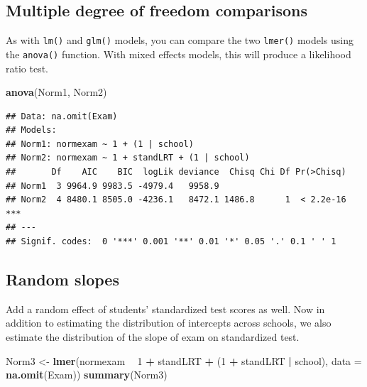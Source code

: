 \documentclass[]{book}
\newenvironment{Shaded}{\begin{snugshade}}{\end{snugshade}}
\newcommand{\DataTypeTok}[1]{\textcolor[rgb]{0.13,0.29,0.53}{#1}}
\newcommand{\DecValTok}[1]{\textcolor[rgb]{0.00,0.00,0.81}{#1}}
\newcommand{\KeywordTok}[1]{\textcolor[rgb]{0.13,0.29,0.53}{\textbf{#1}}}
\newcommand{\NormalTok}[1]{#1}
\newcommand{\OperatorTok}[1]{\textcolor[rgb]{0.81,0.36,0.00}{\textbf{#1}}}
\newcommand{\StringTok}[1]{\textcolor[rgb]{0.31,0.60,0.02}{#1}}
\begin{document}
\hypertarget{multiple-degree-of-freedom-comparisons}{%
\subsection{Multiple degree of freedom comparisons}\label{multiple-degree-of-freedom-comparisons}}

As with \texttt{lm()} and \texttt{glm()} models, you can compare the two \texttt{lmer()} models using the \texttt{anova()} function. With mixed effects models, this will produce a likelihood ratio test.

\begin{Shaded}
\begin{Highlighting}[]
  \KeywordTok{anova}\NormalTok{(Norm1, Norm2)}
\end{Highlighting}
\end{Shaded}

\begin{verbatim}
## Data: na.omit(Exam)
## Models:
## Norm1: normexam ~ 1 + (1 | school)
## Norm2: normexam ~ 1 + standLRT + (1 | school)
##       Df    AIC    BIC  logLik deviance  Chisq Chi Df Pr(>Chisq)    
## Norm1  3 9964.9 9983.5 -4979.4   9958.9                             
## Norm2  4 8480.1 8505.0 -4236.1   8472.1 1486.8      1  < 2.2e-16 ***
## ---
## Signif. codes:  0 '***' 0.001 '**' 0.01 '*' 0.05 '.' 0.1 ' ' 1
\end{verbatim}

\hypertarget{random-slopes}{%
\subsection{Random slopes}\label{random-slopes}}

Add a random effect of students' standardized test scores as well. Now in addition to estimating the distribution of intercepts across schools, we also estimate the distribution of the slope of exam on standardized test.

\begin{Shaded}
\begin{Highlighting}[]
\NormalTok{  Norm3 <-}\StringTok{ }\KeywordTok{lmer}\NormalTok{(normexam }\OperatorTok{~}\StringTok{ }\DecValTok{1} \OperatorTok{+}\StringTok{ }\NormalTok{standLRT }\OperatorTok{+}\StringTok{ }\NormalTok{(}\DecValTok{1} \OperatorTok{+}\StringTok{ }\NormalTok{standLRT }\OperatorTok{|}\StringTok{ }\NormalTok{school), }
                \DataTypeTok{data =} \KeywordTok{na.omit}\NormalTok{(Exam)) }
  \KeywordTok{summary}\NormalTok{(Norm3) }
\end{Highlighting}
\end{Shaded}
\end{document}
